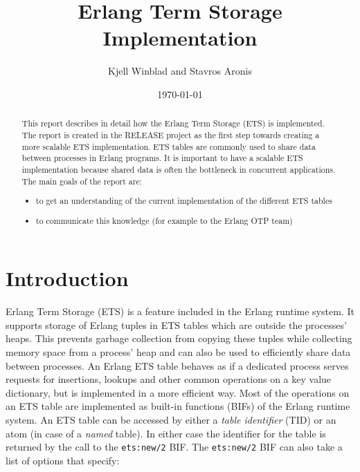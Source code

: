 \documentclass[aps,pre,preprint,nofootinbib]{revtex4}
\begin{document}
\title{Erlang Term Storage Implementation}
\author{Kjell Winblad and Stavros Aronis}
\date{\today}


\begin{abstract}

  This report describes in detail how the Erlang Term Storage (ETS) is implemented.
  The report is created in the RELEASE project as the first step towards creating a more scalable ETS implementation.
  ETS tables are commonly used to share data between processes in Erlang programs.
  It is important to have a scalable ETS implementation because shared data is often the bottleneck in concurrent applications.
  The main goals of the report are:
  \begin{itemize}
   \item to get an understanding of the current implementation of the different ETS tables
   \item to communicate this knowledge (for example to the Erlang OTP team)
  \end{itemize} 

\end{abstract}

\maketitle

\section{Introduction}

Erlang Term Storage (ETS) is a feature included in the Erlang runtime system.
It supports storage of Erlang tuples in ETS tables which are outside the processes' heaps.
This prevents garbage collection from copying these tuples while collecting memory space from a process' heap and can also be used to efficiently share data between processes. %
An Erlang ETS table behaves as if a dedicated process serves requests for insertions, lookups and other common operations on a key value dictionary, but is implemented in a more efficient way.
Most of the operations on an ETS table are implemented as built-in functions (BIFs) of the Erlang runtime system. 
An ETS table can be accessed by either a \emph{table identifier} (TID) or an atom (in case of a \emph{named} table).
In either case the identifier for the table is returned by the call to the \verb|ets:new/2| BIF.
The \verb|ets:new/2| BIF can also take a list of options that specify: 
\end{document}
